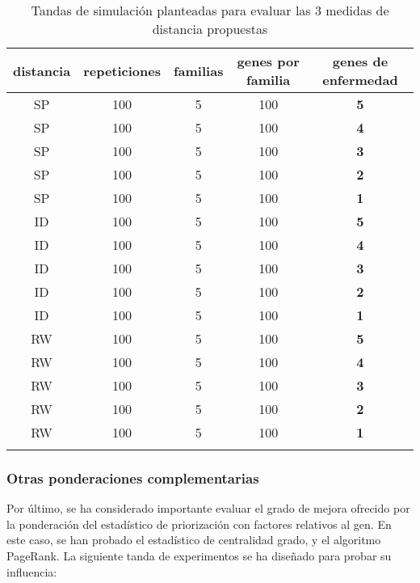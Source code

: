 \bigskip
\begin{small}
\begin{center}
\begin{table}[H]
\begin{tabular}{ccccc}
\textbf{distancia} & \textbf{repeticiones} & \textbf{familias} & \textbf{genes por familia} & \textbf{genes de enfermedad} \tabularnewline 
\hline
\hline
\addlinespace[0.2cm]
SP	 & 100 & 5 & 100 & \textbf{5} \tabularnewline 
SP	 & 100 & 5 & 100 & \textbf{4} \tabularnewline
SP	 & 100 & 5 & 100 & \textbf{3} \tabularnewline
SP	 & 100 & 5 & 100 & \textbf{2} \tabularnewline
SP	 & 100 & 5 & 100 & \textbf{1} \tabularnewline
\addlinespace[0.2cm]
\hline
\addlinespace[0.2cm]
ID	 & 100 & 5 & 100 & \textbf{5} \tabularnewline 
ID	 & 100 & 5 & 100 & \textbf{4} \tabularnewline
ID	 & 100 & 5 & 100 & \textbf{3} \tabularnewline
ID	 & 100 & 5 & 100 & \textbf{2} \tabularnewline
ID	 & 100 & 5 & 100 & \textbf{1} \tabularnewline
\addlinespace[0.2cm]
\hline
\addlinespace[0.2cm]
RW	 & 100 & 5 & 100 & \textbf{5} \tabularnewline 
RW	 & 100 & 5 & 100 & \textbf{4} \tabularnewline
RW	 & 100 & 5 & 100 & \textbf{3} \tabularnewline
RW	 & 100 & 5 & 100 & \textbf{2} \tabularnewline
RW	 & 100 & 5 & 100 & \textbf{1} \tabularnewline
\addlinespace[0.2cm]
\hline
\end{tabular}
\caption{Tandas de simulación planteadas para evaluar las 3 medidas de distancia propuestas}
\label{tab:tabla_disease}
\end{table}

\end{center}
\end{small}
\bigskip

\subsubsection{Otras ponderaciones complementarias}
Por último, se ha considerado importante evaluar el grado de mejora ofrecido por la ponderación del estadístico de priorización con factores relativos al gen. En este caso, se han probado el estadístico de centralidad grado, y el algoritmo PageRank. La siguiente tanda de experimentos se ha diseñado para probar su influencia:


